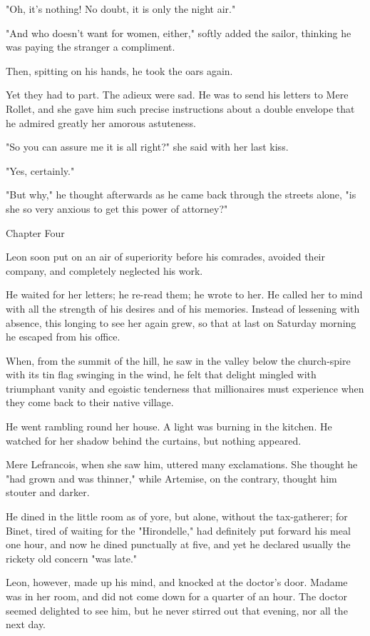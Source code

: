 \documentclass{tufte-book}
\begin{document}
"Oh, it's nothing! No doubt, it is only the night air."

"And who doesn't want for women, either," softly added the sailor,
thinking he was paying the stranger a compliment.

Then, spitting on his hands, he took the oars again.

Yet they had to part. The adieux were sad. He was to send his letters to
Mere Rollet, and she gave him such precise instructions about a double
envelope that he admired greatly her amorous astuteness.

"So you can assure me it is all right?" she said with her last kiss.

"Yes, certainly."

"But why," he thought afterwards as he came back through the streets
alone, "is she so very anxious to get this power of attorney?"



Chapter Four

Leon soon put on an air of superiority before his comrades, avoided
their company, and completely neglected his work.

He waited for her letters; he re-read them; he wrote to her. He called
her to mind with all the strength of his desires and of his memories.
Instead of lessening with absence, this longing to see her again grew,
so that at last on Saturday morning he escaped from his office.

When, from the summit of the hill, he saw in the valley below the
church-spire with its tin flag swinging in the wind, he felt that
delight mingled with triumphant vanity and egoistic tenderness that
millionaires must experience when they come back to their native
village.

He went rambling round her house. A light was burning in the kitchen. He
watched for her shadow behind the curtains, but nothing appeared.

Mere Lefrancois, when she saw him, uttered many exclamations. She
thought he "had grown and was thinner," while Artemise, on the contrary,
thought him stouter and darker.

He dined in the little room as of yore, but alone, without the
tax-gatherer; for Binet, tired of waiting for the "Hirondelle," had
definitely put forward his meal one hour, and now he dined punctually at
five, and yet he declared usually the rickety old concern "was late."

Leon, however, made up his mind, and knocked at the doctor's door.
Madame was in her room, and did not come down for a quarter of an hour.
The doctor seemed delighted to see him, but he never stirred out that
evening, nor all the next day.
\end{document}
